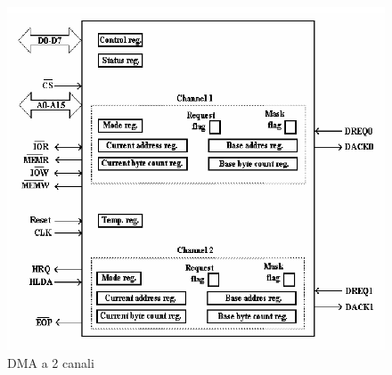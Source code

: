 \begin{figure}
    \centering
    \includegraphics[width=.7\textwidth]{img/DMA.png}
    \caption{DMA a 2 canali}\label{img:DMA}
\end{figure}


